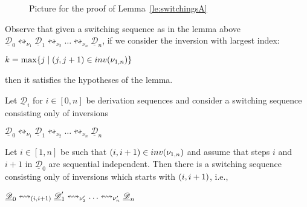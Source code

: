 \documentclass[a4paper,UKenglish,cleveref,pdftex,thm-restate,numberwithinsect,anonymous]{lipics}
\newcommand{\interval}[2][1]{\ensuremath{[{#1},{#2}]}}
\newcommand{\dder}[1]{\mathscr{#1}}
\newcommand{\der}[1]{\underline{\dder{#1}}}
\newcommand{\inv}[1]{\mathsf{inv}({#1})}
\newcommand{\shift}[1]{\ensuremath{\mathrel{{\leftrightsquigarrow}_{#1}}}}
\begin{document}
\begin{figure}
  \caption{Picture for the proof of Lemma~\ref{le:switchingsA}}
  \label{fi:switchA}
\end{figure}


\begin{remark}
  \label{rem:switchA}
  Observe that given a switching sequence as in the lemma above
  $\der{D}_0 \shift{\nu_1} \der{D}_1 \shift{\nu_2} \ldots
  \shift{\nu_n} \der{D}_n$, if we consider the inversion with largest index:
  \begin{center}
    $k = \max \{j \mid \transp{j} \in \inv{\nu_{1,n}}\}$
  \end{center}
  then it satisfies the hypotheses of the lemma.
\end{remark}

\begin{lemma}
  \label{le:switchB}
  Let $\der{D}_i$ for $i \in \interval[0]{n}$ be derivation sequences
  and consider a switching sequence consisting only of inversions
  \begin{center}
    $\der{D}_0 \shift{\nu_1} \der{D}_1 \shift{\nu_2} \ldots
    \shift{\nu_n} \der{D}_n$
  \end{center}
  Let $i \in \interval{n}$ be such that
  $\transp{i} \in \inv{\nu_{1,n}}$ and assume that steps $i$ and $i+1$ in $\der{D}_0$ are sequential independent. Then there is a switching sequence
  consisting only of inversions which starts with $\transp{i}$, i.e.,
  \begin{center}
    $\der{D}_0 \shift{\transp{i}} \der{D}_1' \shift{\nu_2'} \ldots
    \shift{\nu_n'} \der{D}_n$
  \end{center}
\end{lemma}
\end{document}
